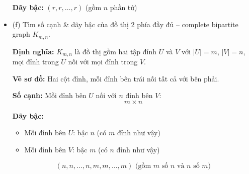 \documentclass{article}
\begin{document}
\begin{itemize}
	 \textbf{Dãy bậc:} $(r, r, \ldots, r)$ (gồm $n$ phần tử)
	 
	 \item (f) Tìm số cạnh \& dãy bậc của đồ thị 2 phía đầy đủ -- complete bipartite graph $K_{m,n}$.
	 
	 \textbf{Định nghĩa:} $K_{m,n}$ là đồ thị gồm hai tập đỉnh $U$ và $V$ với $|U| = m$, $|V| = n$, mọi đỉnh trong $U$ nối với mọi đỉnh trong $V$.
	 
	 \textbf{Vẽ sơ đồ:} Hai cột đỉnh, mỗi đỉnh bên trái nối tất cả với bên phải.
	 
	 \textbf{Số cạnh:} Mỗi đỉnh bên $U$ nối với $n$ đỉnh bên $V$: 
	 \[
	 m \times n
	 \]
	 
	 \textbf{Dãy bậc:}
	 \begin{itemize}
	 	\item Mỗi đỉnh bên $U$: bậc $n$ (có $m$ đỉnh như vậy)
	 	\item Mỗi đỉnh bên $V$: bậc $m$ (có $n$ đỉnh như vậy)
	 \end{itemize}
	 \[
	 (n, n, \ldots, n, m, m, \ldots, m) \text{ (gồm $m$ số $n$ và $n$ số $m$)}
	 \]
	 
	\end{itemize}
	
	
\end{document}
